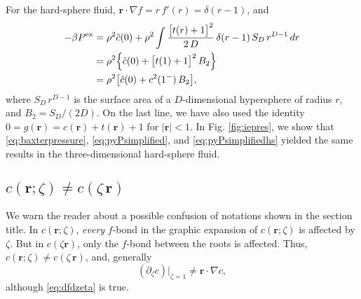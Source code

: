 \documentclass[preprint]{revtex4-1}
\newcommand{\vct}[1]{\mathbf{#1}}
\providecommand{\vr}{} %
\renewcommand{\vr}{\vct{r}}
\newcommand{\supex}[1]{ { { #1 }^{ \mathrm{ex} } } }
\newcommand{\Pex}{\supex{P}}
\begin{document}
For the hard-sphere fluid,
$\vr \cdot \nabla f = r \, f'(r) = \delta(r - 1)$, and
\begin{align}
  -\beta \Pex
&=
  \rho^2 \tilde{c}(0)
  +
  \rho^2 \int
    \frac{ \big[ t(r) + 1 \big]^2 }
         { 2 \, D }
  \, \delta(r - 1)
  \, S_D \, r^{D-1} \, dr
\notag
\\
&=
  \rho^2
  \Bigl\{
    \tilde{c}(0)
  +
  \big[ t(1) + 1 \big]^2 \, B_2
  \Bigr\}
\notag \\
&=
  \rho^2
  \bigl[
    \tilde{c}(0)
  +
    c^2(1^-) \, B_2
  \bigr],
  \label{eq:pyPsimplifiedhs}
\end{align}
%
where
$S_D \, r^{D-1}$ is the surface area of a $D$-dimensional hypersphere of radius $r$,
and $B_2 = S_D / (2D)$.
%
On the last line, we have also used the identity
$0 = g(\vr) = c(\vr) + t(\vr) + 1$
for $|\vr| < 1$.
%
In Fig. \ref{fig:iepres},
we show that
\eqref{eq:baxterpressure},
\eqref{eq:pyPsimplified},
and
\eqref{eq:pyPsimplifiedhs}
yielded the same results
in the three-dimensional hard-sphere fluid.



\subsection{$c(\vr; \zeta) \ne c(\zeta \, \vr)$}


We warn the reader about a possible confusion of notations
shown in the section title.
%
In $c(\vr; \zeta)$,
\emph{every} $f$-bond
in the graphic expansion of $c(\vr; \zeta)$
is affected by $\zeta$.
%
But in $c(\zeta \vr)$,
only the $f$-bond between the roots is affected.
%
Thus,
$c(\vr; \zeta) \ne c(\zeta \, \vr)$,
and, generally
\[
  (\partial_\zeta c) \big|_{\zeta = 1}
\ne
  \vr \cdot \nabla c,
\]
although \eqref{eq:dfdzeta} is true.
%
\end{document}
